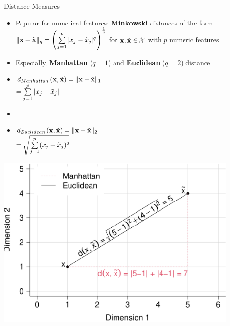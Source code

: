 \documentclass[11pt,compress,t,notes=noshow, xcolor=table]{beamer}
\begin{document}
%
\begin{vbframe}{Distance Measures}







\begin{itemize}
  \item Popular for numerical features: \textbf{Minkowski} distances
  of the form $\| \mathbf{x} - \tilde {\mathbf{x}} \|_q = \left( \sum\limits_{j=1}^p |x_j - \tilde x_j|^q
  \right)^{\frac{1}{q}}$ for $\mathbf{x}, \tilde{\mathbf{x}} \in \mathcal{X}$ with $p$ numeric
  features
  \item Especially, \textbf{Manhattan} ($q = 1$) and \textbf{Euclidean}
  ($q = 2$) distance
\end{itemize}

\vspace{0.3cm}

\begin{minipage}{0.42\textwidth}
  \begin{itemize}
    \small
    \item[] $d_{Manhattan}\left(\mathbf{x}, \tilde{\mathbf{x}}\right) = \| \mathbf{x} -
    \tilde {\mathbf{x}} \|_1$ \\
    $=\sum\limits_{j=1}^p |x_j - \tilde{x}_j| $
    \item[]
    \item[] $d_{Euclidean}\left(\mathbf{x}, \tilde{\mathbf{x}}\right) = \| \mathbf{x} -
    \tilde {\mathbf{x}} \|_2$ \\
    \vspace{0.1cm}
    $= \sqrt{\sum\limits_{j=1}^p(x_j- \tilde{x}_j)^2}$
  \end {itemize}
\end{minipage}%
\begin{minipage}{0.58\textwidth}
 \centering \includegraphics[width=0.9\textwidth,keepaspectratio]{figure/reg_knn_2}
\end{minipage}



\end{vbframe}
\end{document}
